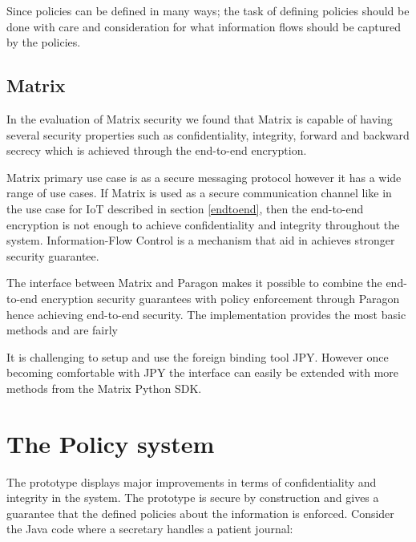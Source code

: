 Since policies can be defined in many ways; the task of defining policies should be done with care and consideration for what information flows should be captured by the policies.




\subsection{Matrix}

In the evaluation of Matrix security we found that Matrix is capable of having several security properties such as confidentiality, integrity, forward and backward secrecy which is achieved through the end-to-end encryption.

Matrix primary use case is as a secure messaging protocol however it has a wide range of use cases. If Matrix is used as a secure communication channel like in the use case for IoT described in section \ref{endtoend}, then the end-to-end encryption is not enough to achieve confidentiality and integrity throughout the system. Information-Flow Control is a mechanism that aid in achieves stronger security guarantee.

The interface between Matrix and Paragon makes it possible to combine the end-to-end encryption security guarantees with policy enforcement through Paragon hence achieving end-to-end security. The implementation provides the most basic methods and are fairly

It is challenging to setup and use the foreign binding tool JPY. However once becoming comfortable with JPY the interface can easily be extended with more methods from the Matrix Python SDK.

\section{The Policy system}


The prototype displays major improvements in terms of confidentiality and integrity in the system. The prototype is secure by construction and gives a guarantee that the defined policies about the information is enforced. Consider the Java code where a secretary handles a patient journal: 

